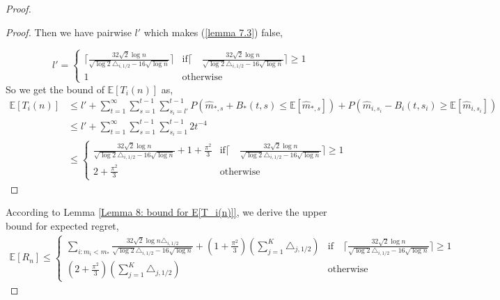 \documentclass{article}
\theoremstyle{plain}
\begin{document}
\begin{proof}
\begin{proof}
    Then we have pairwise $l'$ which makes (\ref{lemma 7.3}) false,
    
    \[ l' = \begin{cases} 
      \lceil \frac{32 \sqrt{2} \log n}{\sqrt{\log 2} \triangle_{i, 1/2} - 16 \sqrt{\log n}} \rceil &  \text{if} \lceil \quad \frac{32 \sqrt{2} \log n}{\sqrt{\log 2} \triangle_{i, 1/2} - 16 \sqrt{\log n}} \rceil \geq 1 \\
      1 & \text{otherwise} 
   \end{cases}
        \]
    So we get the bound of $\mathbb{E}[T_i(n)]$ as,
    \begin{align}
        \mathbb{E}[T_i(n)] &\leq l' + \sum_{t = 1}^\infty \sum_{s = 1}^{t-1} \sum_{s_i = l'}^{t-1} P(\hat{m}_{*, s} + B_*(t, s) \leq  \mathbb{E}[\hat{m}_{*, s}]) + P(\hat{m}_{i, s_i} - B_i(t, s_i) \geq \mathbb{E}[\hat{m}_{i, s_i}])\\
        & \leq l' + \sum_{t = 1}^\infty \sum_{s = 1}^{t-1} \sum_{s_i = 1}^{t-1} 2 t^{-4}\\
        & \leq \begin{cases} 
           \frac{32 \sqrt{2} \log n}{\sqrt{\log 2} \triangle_{i, 1/2} - 16 \sqrt{\log n}} + 1 + \frac{\pi^2}{3} &  \text{if} \lceil \quad \frac{32 \sqrt{2} \log n}{\sqrt{\log 2} \triangle_{i, 1/2} - 16 \sqrt{\log n}} \rceil \geq 1 \\
          2 + \frac{\pi^2}{3} & \text{otherwise} 
   \end{cases}
    \end{align}
   
\end{proof}

According to Lemma \ref{Lemma 8: bound for E[T_i(n)]}, we derive the upper bound for expected regret,
\begin{align}
    \mathbb{E}[R_n] \leq \begin{cases} 
          \sum_{i: m_i < m_\ast} \frac{32 \sqrt{2} \log n \triangle_{i, 1/2}}{\sqrt{\log 2} \triangle_{i, 1/2} - 16 \sqrt{\log n}} + (1 + \frac{\pi^2}{3}) (\sum_{j=1}^K \triangle_{j, 1/2}) &  \text{if} \quad  \lceil \frac{32 \sqrt{2} \log n}{\sqrt{\log 2} \triangle_{i, 1/2} - 16 \sqrt{\log n}} \rceil \geq 1 \\
          (2 + \frac{\pi^2}{3}) (\sum_{j=1}^K \triangle_{j, 1/2}) & \text{otherwise} 
   \end{cases}
\end{align}
   
\end{proof}


\printbibliography
\end{document}
